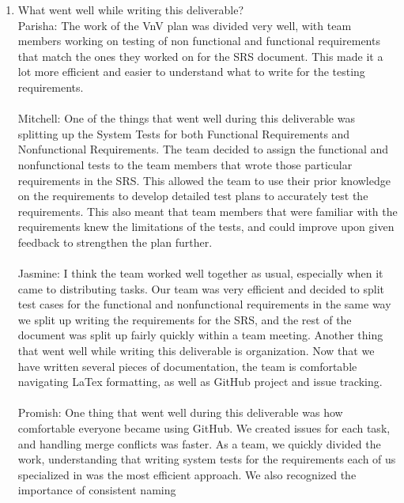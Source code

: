 \documentclass[12pt, titlepage]{article}
\begin{document}
\begin{enumerate}
  \item What went well while writing this deliverable?\\
  \newline
  \hspace{2em} Parisha: The work of the VnV plan was divided very well, 
  with team members working on testing of non functional and functional requirements that match
  the ones they worked on for the SRS document. This made it a lot more efficient and easier to understand
  what to write for the testing requirements. \\\\
  \hspace{2em} Mitchell: One of the things that went well during this deliverable was splitting up
  the System Tests for both Functional Requirements and Nonfunctional Requirements. The team decided
  to assign the functional and nonfunctional tests to the team members that wrote those particular
  requirements in the SRS. This allowed the team to use their prior knowledge on the requirements
  to develop detailed test plans to accurately test the requirements. This also meant that team members
  that were familiar with the requirements knew the limitations of the tests, and could improve upon
  given feedback to strengthen the plan further.\\\\
  \hspace{2em} Jasmine: I think the team worked well together as usual, especially when it came to 
  distributing tasks. Our team was very efficient and decided to split test cases for the functional and 
  nonfunctional requirements in the same way we split up writing the requirements for the SRS, and the 
  rest of the document was split up fairly quickly within a team meeting. Another thing that went well 
  while writing this deliverable is organization. Now that we have written several pieces of documentation, 
  the team is comfortable navigating LaTex formatting, as well as GitHub project and issue tracking.\\\\
  \hspace{2em} Promish: One thing that went well during this deliverable was how 
  comfortable everyone became using GitHub. We created issues for each task, and 
  handling merge conflicts was faster. As a team, we quickly divided the work, 
  understanding that writing system tests for the requirements each of us specialized in 
  was the most efficient approach. We also recognized the importance of consistent naming 

\end{enumerate}
\end{document}
